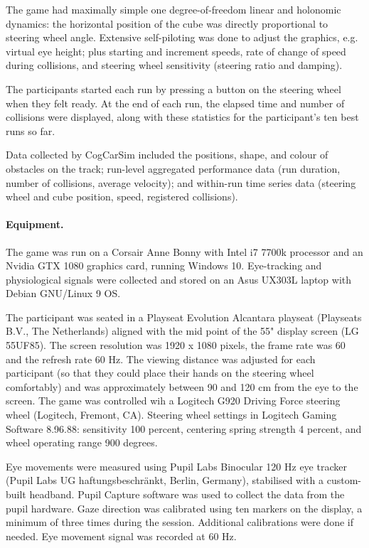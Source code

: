 \documentclass[fleqn,10pt]{wlscirep}
\begin{document}
The game had maximally simple one degree-of-freedom linear and holonomic dynamics: the horizontal position of the cube was directly proportional to steering wheel angle. Extensive self-piloting was done to adjust the graphics, e.g. virtual eye height; plus starting and increment speeds, rate of change of speed during collisions, and steering wheel sensitivity (steering ratio and damping).

The participants started each run by pressing a button on the steering wheel when they felt ready. At the end of each run, the elapsed time and number of collisions were displayed, along with these statistics for the participant's ten best runs so far.

Data collected by CogCarSim included the positions, shape, and colour of obstacles on the track; run-level aggregated performance data (run duration, number of collisions, average velocity); and within-run time series data (steering wheel and cube position, speed, registered collisions).

\paragraph{Equipment.} The game was run on a Corsair Anne Bonny with Intel i7 7700k processor and an Nvidia GTX 1080 graphics card, running Windows 10. Eye-tracking and physiological signals were collected and stored on an Asus UX303L laptop with Debian GNU/Linux 9 OS.

The participant was seated in a Playseat Evolution Alcantara playseat (Playseats B.V., The Netherlands) aligned with the mid point of the 55" display screen (LG 55UF85). The screen resolution was 1920 x 1080 pixels, the frame rate was 60 and the refresh rate 60 Hz. The viewing distance was adjusted for each participant (so that they could place their hands on the steering wheel comfortably) and was approximately between 90 and 120 cm from the eye to the screen. The game was controlled wih a Logitech G920 Driving Force steering wheel (Logitech, Fremont, CA). Steering wheel settings in Logitech Gaming Software 8.96.88: sensitivity 100 percent, centering spring strength 4 percent, and wheel operating range 900 degrees.

Eye movements were measured using Pupil Labs Binocular 120 Hz eye tracker (Pupil Labs UG haftungsbeschränkt, Berlin, Germany), stabilised with a custom-built headband.
Pupil Capture software was used to collect the data from the pupil hardware. Gaze direction was calibrated using ten markers on the display, a minimum of three times during the session. Additional calibrations were done if needed. Eye movement signal was recorded at 60 Hz.
\end{document}
